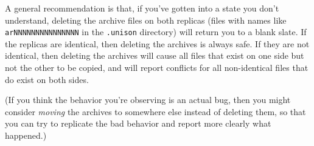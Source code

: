 
A general recommendation is that, if you've gotten into a state you don't
understand, deleting the archive files on both replicas (files with names
like {\tt arNNNNNNNNNNNNNNN} in the {\tt .unison} directory) will return
you to a blank slate.  If the replicas are identical, then deleting the
archives is always safe.  If they are not identical, then deleting the
archives will cause all files that exist on one side but not the other to
be copied, and will report conflicts for all non-identical files that
do exist on both sides.

(If you think the behavior you're observing is an actual bug, then you
might consider {\em moving} the archives to somewhere else instead of
deleting them, so that you can try to replicate the bad behavior and
report more clearly what happened.)

